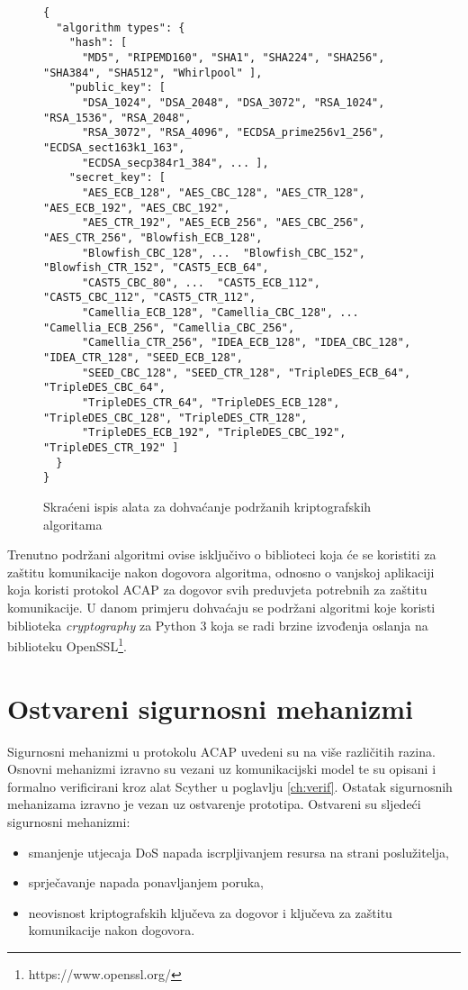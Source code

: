 \begin{figure}[htb]
\begin{footnotesize}
\begin{verbatim}
{
  "algorithm types": {
    "hash": [
      "MD5", "RIPEMD160", "SHA1", "SHA224", "SHA256", "SHA384", "SHA512", "Whirlpool" ],
    "public_key": [
      "DSA_1024", "DSA_2048", "DSA_3072", "RSA_1024", "RSA_1536", "RSA_2048",
      "RSA_3072", "RSA_4096", "ECDSA_prime256v1_256", "ECDSA_sect163k1_163",
      "ECDSA_secp384r1_384", ... ],
    "secret_key": [
      "AES_ECB_128", "AES_CBC_128", "AES_CTR_128", "AES_ECB_192", "AES_CBC_192",
      "AES_CTR_192", "AES_ECB_256", "AES_CBC_256", "AES_CTR_256", "Blowfish_ECB_128",
      "Blowfish_CBC_128", ...  "Blowfish_CBC_152", "Blowfish_CTR_152", "CAST5_ECB_64",
      "CAST5_CBC_80", ...  "CAST5_ECB_112", "CAST5_CBC_112", "CAST5_CTR_112",
      "Camellia_ECB_128", "Camellia_CBC_128", ...  "Camellia_ECB_256", "Camellia_CBC_256",
      "Camellia_CTR_256", "IDEA_ECB_128", "IDEA_CBC_128", "IDEA_CTR_128", "SEED_ECB_128",
      "SEED_CBC_128", "SEED_CTR_128", "TripleDES_ECB_64", "TripleDES_CBC_64",
      "TripleDES_CTR_64", "TripleDES_ECB_128", "TripleDES_CBC_128", "TripleDES_CTR_128",
      "TripleDES_ECB_192", "TripleDES_CBC_192", "TripleDES_CTR_192" ]
  }
}
\end{verbatim}
\end{footnotesize}
\vspace{-20pt}
\caption{Skraćeni ispis alata za dohvaćanje podržanih kriptografskih algoritama}
\label{fig:fetch_algs}
\end{figure}

Trenutno podržani algoritmi ovise isključivo o biblioteci koja će se koristiti
za zaštitu komunikacije nakon dogovora algoritma, odnosno o vanjskoj aplikaciji
koja koristi protokol ACAP za dogovor svih preduvjeta potrebnih za zaštitu
komunikacije. U danom primjeru dohvaćaju se podržani algoritmi koje koristi
biblioteka \emph{cryptography} za Python 3 koja se radi brzine izvođenja oslanja
na biblioteku OpenSSL\footnote{https://www.openssl.org/}.

\section{Ostvareni sigurnosni mehanizmi}

Sigurnosni mehanizmi u protokolu ACAP uvedeni su na više različitih razina.
Osnovni mehanizmi izravno su vezani uz komunikacijski model te su opisani i
formalno verificirani kroz alat Scyther u poglavlju \ref{ch:verif}.
Ostatak sigurnosnih mehanizama izravno je vezan uz ostvarenje prototipa.
Ostvareni su sljedeći sigurnosni mehanizmi:
\begin{itemize}
    \item smanjenje utjecaja DoS napada iscrpljivanjem resursa na strani
	poslužitelja,
    \item sprječavanje napada ponavljanjem poruka,
    \item neovisnost kriptografskih ključeva za dogovor i ključeva za zaštitu
	komunikacije nakon dogovora.
\end{itemize}

